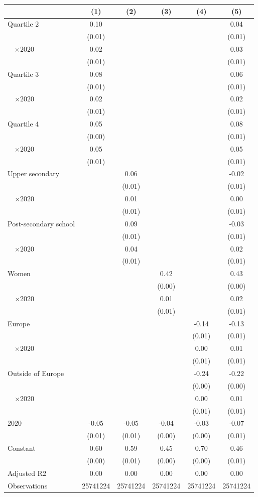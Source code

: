 
\begin{tabular}{@{}l*{5}{S[table-format={-}2.2{\tnote{***}}]}@{}}
\toprule
{} & {(1)} & {(2)} & {(3)} & {(4)} & {(5)}\tabularnewline%
\midrule
Quartile 2 & 0.10\tnote{***} &  &  &  & 0.04\tnote{***}\tabularnewline%
 & (0.01) &  &  &  & \vphantom{4} (0.01)\tabularnewline%
~~\(\times 2020\) & 0.02\tnote{*} &  &  &  & 0.03\tnote{**}\tabularnewline%
 & (0.01) &  &  &  & \vphantom{3} (0.01)\tabularnewline%
Quartile 3 & 0.08\tnote{***} &  &  &  & 0.06\tnote{***}\tabularnewline%
 & (0.01) &  &  &  & \vphantom{2} (0.01)\tabularnewline%
~~\(\times 2020\) & 0.02\tnote{*} &  &  &  & 0.02\tnote{*}\tabularnewline%
 & (0.01) &  &  &  & \vphantom{1} (0.01)\tabularnewline%
Quartile 4 & 0.05\tnote{***} &  &  &  & 0.08\tnote{***}\tabularnewline%
 & (0.00) &  &  &  & (0.01)\tabularnewline%
~~\(\times 2020\) & 0.05\tnote{***} &  &  &  & 0.05\tnote{***}\tabularnewline%
 & (0.01) &  &  &  & (0.01)\tabularnewline%
Upper secondary &  & 0.06\tnote{***} &  &  & -0.02\tnote{*}\tabularnewline%
 &  & (0.01) &  &  & \vphantom{3} (0.01)\tabularnewline%
~~\(\times 2020\) &  & 0.01 &  &  & 0.00\tabularnewline%
 &  & (0.01) &  &  & \vphantom{2} (0.01)\tabularnewline%
Post-secondary school &  & 0.09\tnote{***} &  &  & -0.03\tnote{***}\tabularnewline%
 &  & (0.01) &  &  & \vphantom{1} (0.01)\tabularnewline%
~~\(\times 2020\) &  & 0.04\tnote{**} &  &  & 0.02\tabularnewline%
 &  & (0.01) &  &  & (0.01)\tabularnewline%
Women &  &  & 0.42\tnote{***} &  & 0.43\tnote{***}\tabularnewline%
 &  &  & (0.00) &  & (0.00)\tabularnewline%
~~\(\times 2020\) &  &  & 0.01\tnote{\dagger} &  & 0.02\tnote{\dagger}\tabularnewline%
 &  &  & (0.01) &  & (0.01)\tabularnewline%
Europe &  &  &  & -0.14\tnote{***} & -0.13\tnote{***}\tabularnewline%
 &  &  &  & (0.01) & \vphantom{2} (0.01)\tabularnewline%
~~\(\times 2020\) &  &  &  & 0.00 & \vphantom{1} 0.01\tabularnewline%
 &  &  &  & (0.01) & \vphantom{1} (0.01)\tabularnewline%
Outside of Europe &  &  &  & -0.24\tnote{***} & -0.22\tnote{***}\tabularnewline%
 &  &  &  & (0.00) & (0.00)\tabularnewline%
~~\(\times 2020\) &  &  &  & 0.00 & 0.01\tabularnewline%
 &  &  &  & (0.01) & (0.01)\tabularnewline%
\midrule
\(2020\) & -0.05\tnote{***} & -0.05\tnote{***} & -0.04\tnote{***} & -0.03\tnote{***} & -0.07\tnote{***}\tabularnewline%
 & (0.01) & (0.01) & (0.00) & (0.00) & (0.01)\tabularnewline%
Constant & 0.60\tnote{***} & 0.59\tnote{***} & 0.45\tnote{***} & 0.70\tnote{***} & 0.46\tnote{***}\tabularnewline%
 & (0.00) & (0.01) & (0.00) & (0.00) & (0.01)\tabularnewline%
\midrule
Adjusted R2 & 0.00 & 0.00 & 0.00 & 0.00 & 0.00\tabularnewline%
Observations & {\num{25741224}} & {\num{25741224}} & {\num{25741224}} & {\num{25741224}} & {\num{25741224}}\tabularnewline%
\bottomrule
\end{tabular}
